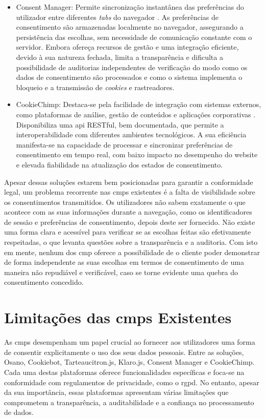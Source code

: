 \begin{itemize}
    \item Consent Manager: Permite sincronização instantânea das preferências do utilizador entre diferentes \textit{tabs} do navegador \cite{ConsentManager2024}. As preferências de consentimento são armazenadas localmente no navegador, assegurando a persistência das escolhas, sem necessidade de comunicação constante com o servidor. Embora ofereça recursos de gestão e uma integração eficiente, devido à sua natureza fechada, limita a transparência e dificulta a possibilidade de auditorias independentes de verificação do modo como os dados de consentimento são processados e como o sistema implementa o bloqueio e a transmissão de \textit{cookies} e rastreadores.

    \item CookieChimp: Destaca-se pela facilidade de integração com sistemas externos, como plataformas de análise, gestão de conteúdos e aplicações corporativas \cite{CookieChimp2024}. Disponibiliza uma \acrshort{api} RESTful, bem documentada, que permite a interoperabilidade com diferentes ambientes tecnológicos. A sua eficiência manifesta-se na capacidade de processar e sincronizar preferências de consentimento em tempo real, com baixo impacto no desempenho do website e elevada fiabilidade na atualização dos estados de consentimento.
\end{itemize}

Apesar dessas soluções estarem bem posicionadas para garantir a conformidade legal, um problema recorrente nas \acrshort{cmp}s existentes é a falta de visibilidade sobre os consentimentos transmitidos. Os utilizadores não sabem exatamente o que acontece com as suas informações durante a navegação, como os identificadores de sessão e preferências de consentimento, depois deste ser fornecido. Não existe uma forma clara e acessível para verificar se as escolhas feitas são efetivamente respeitadas, o que levanta questões sobre a transparência e a auditoria. Com isto em mente, nenhum dos \acrshort{cmp} oferece a possibilidade de o cliente poder demonstrar de forma independente as suas escolhas em termos de consentimento de uma maneira não repudiável e verificável, caso se torne evidente uma quebra do consentimento concedido.


\section{Limitações das \acrshort{cmp}s Existentes}

As \acrshort{cmp}s desempenham um papel crucial ao fornecer aos utilizadores uma forma de consentir explicitamente o uso dos seus dados pessoais. Entre as soluções, Osano, Cookiebot, Tarteaucitron.js, Klaro.js, Consent Manager e CookieChimp. Cada uma destas plataformas oferece funcionalidades específicas e foca-se na conformidade com regulamentos de privacidade, como o \acrshort{rgpd}. No entanto, apesar da sua importância, essas plataformas apresentam várias limitações que comprometem a transparência, a auditabilidade e a confiança no processamento de dados.

